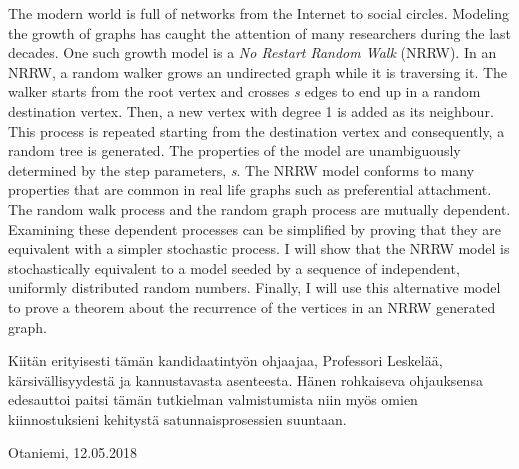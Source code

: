 \documentclass[finnish, 12pt, a4paper, sci, utf8, pdfa]{aaltothesis}
\begin{document}
\newpage
\begin{abstractpage}[english]
The modern world is full of networks from the Internet to social circles. Modeling the growth
of graphs has caught the attention of many researchers during the last decades. One such growth model
is a \textit{No Restart Random Walk} (NRRW). In an NRRW, a random walker grows
an undirected graph while it is traversing it. The walker starts from the root vertex and crosses \textit{s}
edges to end up in a random destination vertex. Then, a new vertex with degree 1 is added as its neighbour. 
This process is repeated starting from the destination vertex and consequently, a random tree is generated. 
The properties of the model are unambiguously determined by the step parameters, \textit{s}.
The NRRW model conforms to many properties that are common in real life graphs such as
preferential attachment. The random walk process and the random graph process are
mutually dependent. Examining these dependent processes can be simplified by proving that they
are equivalent with a simpler stochastic process. I will show that the NRRW model is stochastically
equivalent to a model seeded by a sequence of independent, uniformly distributed random numbers. Finally, I
will use this alternative model to prove a theorem about the recurrence of the vertices in an NRRW 
generated graph.
\end{abstractpage}

\newpage

Kiitän erityisesti tämän kandidaatintyön ohjaajaa, Professori Leskelää, kärsivällisyydestä ja kannustavasta asenteesta. Hänen rohkaiseva ohjauksensa
edesauttoi paitsi tämän tutkielman valmistumista niin myös omien kiinnostuksieni kehitystä satunnaisprosessien suuntaan.

\vspace{5cm}
Otaniemi, 12.05.2018
\end{document}
